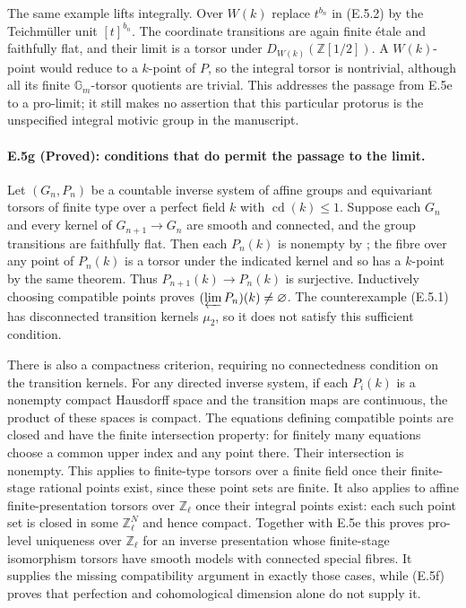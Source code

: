 The same example lifts integrally. Over $W(k)$ replace $t^{b_n}$ in
(E.5.2) by the Teichm\"uller unit $[t]^{b_n}$. The coordinate transitions
are again finite \'etale and faithfully flat, and their limit is a
torsor under $D_{W(k)}(\mathbb Z[1/2])$. A $W(k)$-point would reduce to
a $k$-point of $P$, so the integral torsor is nontrivial, although all
its finite $\mathbb G_m$-torsor quotients are trivial.
This addresses the passage from E.5e to a pro-limit; it still makes
no assertion that this particular protorus is the unspecified
integral motivic group in the manuscript.

\paragraph{E.5g (Proved): conditions that do permit the passage to the limit.}
Let $(G_n,P_n)$ be a countable inverse system of affine groups and
equivariant torsors of finite type over a perfect field $k$ with
$\operatorname{cd}(k)\leq1$. Suppose each $G_n$ and every kernel of
$G_{n+1}\to G_n$ are smooth and connected, and the group transitions
are faithfully flat. Then each $P_n(k)$ is nonempty by
\citet[Theorem 1.9]{D_Steinberg1965}; the fibre over any point of
$P_n(k)$ is a torsor under the indicated kernel and so has a
$k$-point by the same theorem. Thus
$P_{n+1}(k)\to P_n(k)$ is surjective. Inductively choosing compatible
points proves $(\varprojlim P_n)(k)\ne\varnothing$.
The counterexample (E.5.1) has disconnected transition kernels
$\mu_2$, so it does not satisfy this sufficient condition.

There is also a compactness criterion, requiring no connectedness
condition on the transition kernels. For any directed inverse
system, if each $P_i(k)$ is a nonempty compact Hausdorff space and the
transition maps are continuous, the product of these spaces is
compact. The equations defining compatible points are closed and
have the finite intersection property: for finitely many equations
choose a common upper index and any point there. Their intersection
is nonempty. This applies to finite-type torsors over a finite
field once their finite-stage rational points exist, since these
point sets are finite. It also applies to affine finite-presentation
torsors over $\mathbb Z_\ell$ once their integral points exist:
each such point set is closed in some $\mathbb Z_\ell^N$ and hence
compact. Together with E.5e this proves pro-level uniqueness over
$\mathbb Z_\ell$ for an inverse presentation whose finite-stage
isomorphism torsors have smooth models with connected special fibres.
It supplies the missing compatibility argument in exactly those
cases, while (E.5f) proves that perfection and cohomological
dimension alone do not supply it.


